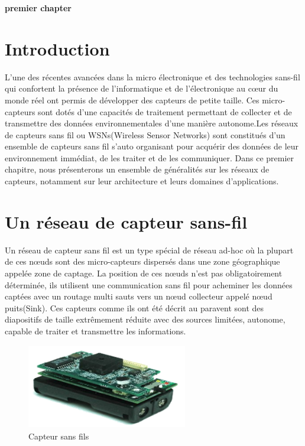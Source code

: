 

\cleardoublepage


\setcounter{chapter}{1}



\begin{center}
	\Huge\textbf{premier chapter}
\end{center}

\section{Introduction}
L’une des récentes avancées dans la micro électronique et des technologies sans-fil qui confortent la présence de l’informatique et de l’électronique au cœur du monde réel ont permis de développer des capteurs de petite taille. Ces  micro-capteurs sont dotés d’une capacités de traitement permettant de collecter et de transmettre des données environnementales d'une manière autonome.Les réseaux de capteurs sans fil ou WSNs(Wireless Sensor Networks) sont constitués d’un ensemble de capteurs sans fil s’auto organisant pour acquérir des données de leur environnement immédiat, de les traiter et de les communiquer.
Dans ce premier chapitre, nous présenterons un ensemble de généralités sur les réseaux de capteurs, notamment sur leur architecture et leurs domaines d’applications.\\

\section{Un réseau de capteur sans-fil}
Un réseau de capteur sans fil est un type spécial de réseau ad-hoc où la plupart de ces nœuds sont des micro-capteurs dispersés dans une zone géographique appelée zone de captage. La position de ces nœuds n’est pas obligatoirement déterminée, ils utilisent une communication sans fil pour acheminer les données captées avec un routage multi sauts vers un nœud collecteur appelé nœud puits(Sink). Ces capteurs comme ils ont été décrit au paravent  sont des diapositifs de taille extrêmement réduite avec des sources limitées, autonome, capable de traiter et transmettre les informations.\\
\begin{figure}[H]
	\centering
	\includegraphics[width=7cm,height=3.7cm]{Chap1/1.png}
	\caption{Capteur sans fils}
	\label{fig:CSF}
\end{figure}

